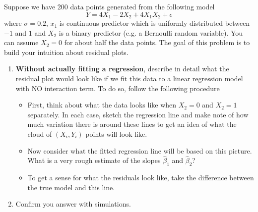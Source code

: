\begin{exercise}
Suppose we have 200 data points generated from the following model
\begin{equation}
Y = 4X_1 - 2X_2 + 4X_1 X_2 + \epsilon
\end{equation}
where $\sigma = 0.2$, $x_1$ is continuous predictor which is uniformly distributed between $-1$ and $1$ and $X_2$ is a binary predictor (e.g. a Bernoulli random variable). You can assume $X_2=0$ for about half the data points. The goal of this problem is to build your intuition about residual plots. 
\begin{enumerate}[label=(\alph*)]
\item  {\bf Without actually fitting a regression}, describe in detail what the residual plot would look like if we fit this data to a linear regression model with NO interaction term. To do so, follow the following procedure 
\begin{itemize}
\item First, think about what the data looks like when $X_2=0$ and $X_2=1$ separately. In each case, sketch the regression line and make note of how much variation there is around these lines to get an idea of what the cloud of $(X_i,Y_i)$ points will look like.  
\item Now consider what the fitted regression line will be based on this picture.  What is a very rough estimate of the slopes $\hat{\beta}_1$ and $\hat{\beta}_2$?
\item To get a sense for what the residuals look like, take the difference between the true model and this line.
\end{itemize}
\item Confirm you answer with simulations. 
\end{enumerate}
\end{exercise}

